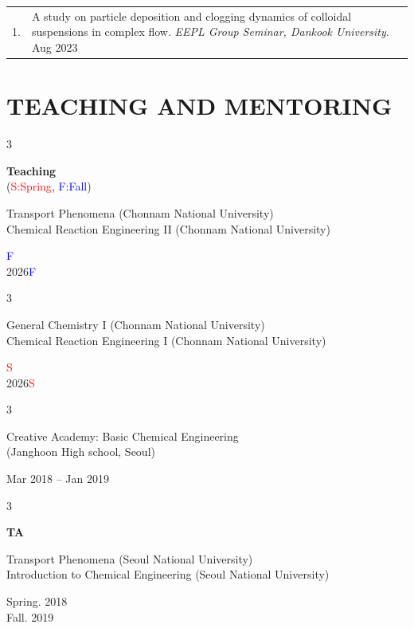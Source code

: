 \documentclass[11pt, a4paper]{article}
\makeatletter
\newenvironment{pubitem}[2]{%
  \begin{tabularx}{\textwidth}{@{}p{1cm}X@{}}
  #1 & #2 \\
  \end{tabularx}
}{}
\newenvironment{threecolentryteach}[3][]{
    \onecolentry
    \def\thirdColumn{#3}
    \setcolumnwidth{3.5cm, \fill, 2.5 cm}
    \begin{paracol}{3}
    {\raggedright #2} \switchcolumn
}{
    \switchcolumn \raggedleft \thirdColumn
    \end{paracol}
    \endonecolentry
} %
\makeatother
\begin{document}
    \vspace{0.3em}

    \begin{pubitem}{1.}{A study on particle deposition and clogging dynamics of colloidal suspensions in complex flow. 
    \textit{EEPL Group Seminar, Dankook University}. Aug 2023}
    \end{pubitem}


    
    \section{TEACHING AND MENTORING}
    
        \begin{threecolentryteach}
             {\textbf{Teaching}\\(\textcolor{red}{S:Spring}, \textcolor{blue}{F:Fall})}
             {2026\textcolor{blue}{F}\\2026\textcolor{blue}{F}}
             {Transport Phenomena (Chonnam National University)\\Chemical Reaction Engineering II (Chonnam National University)}
        \end{threecolentryteach}

        \vspace{0.2em}

        \begin{threecolentryteach}
             {}
             {2026\textcolor{red}{S}\\2026\textcolor{red}{S}}
             {General Chemistry I (Chonnam National University)\\Chemical Reaction Engineering I (Chonnam National University)}
        \end{threecolentryteach}

        \vspace{0.2em}
        
        \begin{threecolentryteach}
        {}{Mar 2018 – Jan 2019}{Creative Academy: Basic Chemical Engineering\\(Janghoon High school, Seoul)}

        \end{threecolentryteach}



        
        \vspace{0.5em} 
        
        \begin{threecolentryteach}
             {\textbf{TA}}
             {Spring. 2018\\Fall. 2019}
             {Transport Phenomena (Seoul National University)\\Introduction to Chemical Engineering (Seoul National University)}
        \end{threecolentryteach}
        
\end{document}
